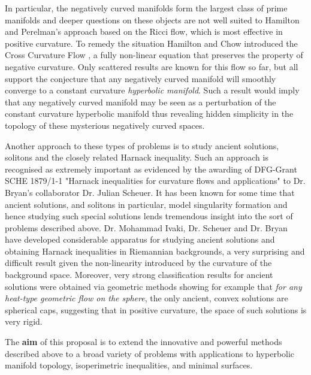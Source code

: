 \documentclass[12pt]{amsart}
\begin{document}
In particular, the negatively curved manifolds form the largest class of prime manifolds and deeper questions on these objects are not well suited to Hamilton and Perelman's approach based on the Ricci flow, which is most effective in positive curvature. To remedy the situation Hamilton and Chow introduced the Cross Curvature Flow \cite{MR2055396}, a fully non-linear equation that preserves the property of negative curvature. Only scattered results are known for this flow so far, but all support the conjecture that any negatively curved manifold will smoothly converge to a constant curvature \emph{hyperbolic manifold}. Such a result would imply that any negatively curved manifold may be seen as a perturbation of the constant curvature hyperbolic manifold thus revealing hidden simplicity in the topology of these mysterious negatively curved spaces.

Another approach to these types of problems is to study ancient solutions, solitons and the closely related Harnack inequality. Such an approach is recognised as extremely important as evidenced by the awarding of DFG-Grant SCHE 1879/1-1 "Harnack inequalities for curvature flows and applications" to Dr. Bryan's collaborator Dr. Julian Scheuer. It has been known for some time that ancient solutions, and solitons in particular, model singularity formation and hence studying such special solutions lends tremendous insight into the sort of problems described above. Dr. Mohammad Ivaki, Dr. Scheuer and Dr. Bryan have developed considerable apparatus \cite{BIS4,2016arXiv160401694B,2015arXiv150802821B,2015arXiv151203374B} for studying ancient solutions and obtaining Harnack inequalities in Riemannian backgrounds, a very surprising and difficult result given the non-linearity introduced by the curvature of the background space. Moreover, very strong classification results for ancient solutions were obtained via geometric methods showing for example that \emph{for any heat-type geometric flow on the sphere}, the only ancient, convex solutions are spherical caps, suggesting that in positive curvature, the space of such solutions is very rigid.

The \textbf{aim} of this proposal is to extend the innovative and powerful methods described above to a broad variety of problems with applications to hyperbolic manifold topology, isoperimetric inequalities, and minimal surfaces.
\end{document}
